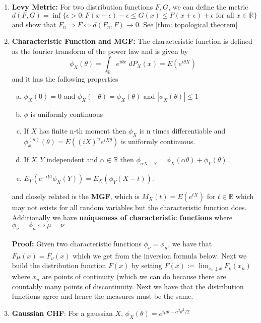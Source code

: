 \documentclass{article}
\begin{document}
\begin{enumerate}
    \item \textbf{Levy Metric:} For two distribution functions \(F,G\), we can define the metric
    \[
    d(F,G) = \inf \{\epsilon > 0: F(x-\epsilon)-\epsilon\leq G(x) \leq F(x+\epsilon) + \epsilon \text{ for all } x \in \mathbb{R}\}
    \]
    and show that \(F_n \Rightarrow F \iff d(F_n, F) \to 0\). See \ref{thm: topological theorem}

    \item \textbf{Characteristic Function and MGF:} The characteristic function is defined as the fourier transform of the power law and is given by
    \[
    \phi_X(\theta) = \int_\mathbb{R} e^{i\theta x} \;dP_X(x) = E(e^{i\theta X})
    \]
    and it has the following properties
    \begin{enumerate} [a.]
        \item \(\phi_X(0) = 0\) and \(\phi_X(-\theta) = \overline{\phi_X(\theta)}\) and \(|\phi_X(\theta)| \leq 1\)
        \item \(\phi\) is uniformly continuous
        \item If \(X\) has finite n-th moment then \(\phi_X\) is n times differentiable and \(\phi_x^{(n)}(\theta) = E((iX)^ne^{iX\theta})\) is uniformly continuous.
        \item If \(X, Y\) independent and \(\alpha \in \mathbb{R}\) then \(\phi_{\alpha X + Y} = \phi_X(\alpha\theta) + \phi_Y(\theta)\).
        \item \(E_Y(e^{-iYt}\phi_X(Y)) = E_X(\phi_Y(X-t)).\)
    \end{enumerate}
    and closely related is the \textbf{MGF}, which is \(M_X(t) = E(e^{tX})\) for \(t \in \mathbb{R}\) which may not exists for all random variables but the characteristic function does.\\

    Additionally we have \textbf{uniqueness of characteristic functions} where \(\phi_\nu = \phi_\mu \iff \mu = \nu\)

    \textbf{Proof:} Given two characteristic functions \(\phi_\nu = \phi_\mu\), we have that \(F\mu(x) = F_\nu(x)\) which we get from the inversion formula below. Next we build the distribution function \(F(x)\) by setting \(F(x) := \lim_{x_n \downarrow x}F_\nu(x_n)\) where \(x_n\) are points of continuity (which we can do because there are countably many points of discontinuity. Next we have that the distribution functions agree and hence the measures must be the same.

    \item \textbf{Gaussian CHF}: For a gaussian \(X\), \(\phi_X(\theta) = e^{i \mu\theta - \sigma^2\theta^2/2}\)


\end{enumerate}
\end{document}
